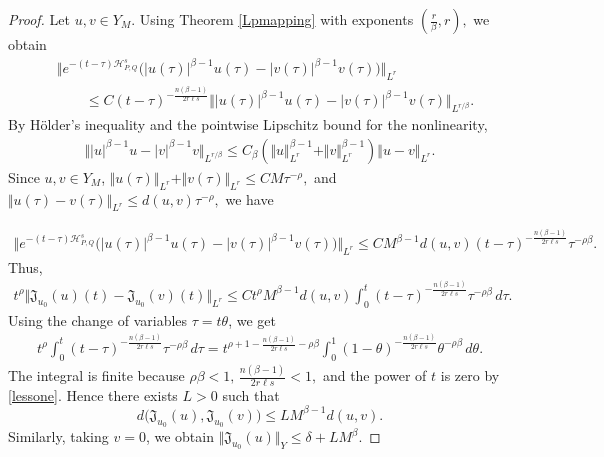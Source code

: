 \documentclass[12pt, reqno]{amsart}
\theoremstyle{definition}
\theoremstyle{remark}
\numberwithin{equation}{section}
\newcommand{\APQ}{\mathcal{H}_{P, Q}}
\begin{document}
\begin{proof}
Let $u,v\in Y_M$. Using Theorem \ref{Lpmapping} with exponents $ \left(\frac r\beta,r\right),$
we obtain
\[
\begin{aligned}
&\Vert
e^{-(t-\tau)\APQ^s}
\big(
|u(\tau)|^{\beta-1}u(\tau)
-
|v(\tau)|^{\beta-1}v(\tau)
\big)
\Vert_{L^r}
\\
&\qquad
\leq
C
(t-\tau)^{-\frac{n(\beta-1)}{2r\ell s}}
\Vert
|u(\tau)|^{\beta-1}u(\tau)
-
|v(\tau)|^{\beta-1}v(\tau)
\Vert_{L^{r/\beta}}.
\end{aligned}
\]
By H\"older's inequality and the pointwise Lipschitz bound for the nonlinearity,
\[
\begin{aligned}
\Vert
|u|^{\beta-1}u
-
|v|^{\beta-1}v
\Vert_{L^{r/\beta}}
\leq
C_\beta
\left(
\Vert u\Vert_{L^r}^{\beta-1}
+
\Vert v\Vert_{L^r}^{\beta-1}
\right)
\Vert u-v\Vert_{L^r}.
\end{aligned}
\]
Since $u,v\in Y_M$, $\Vert u(\tau)\Vert_{L^r} +
    \Vert v(\tau)\Vert_{L^r}
    \leq C M\tau^{-\rho},$
and $\Vert u(\tau)-v(\tau)\Vert_{L^r}
    \leq
    d(u,v)\tau^{-\rho},$ we have

\[
\begin{aligned}
\Vert
e^{-(t-\tau)\APQ^s}
\big(
|u(\tau)|^{\beta-1}u(\tau)
-
|v(\tau)|^{\beta-1}v(\tau)
\big)
\Vert_{L^r}
\leq
C
M^{\beta-1}
d(u,v)
(t-\tau)^{-\frac{n(\beta-1)}{2r\ell s}}
\tau^{-\rho\beta}.
\end{aligned}
\]
Thus,
\[
\begin{aligned}
t^\rho
\Vert
\mathfrak J_{u_0}(u)(t)
-
\mathfrak J_{u_0}(v)(t)
\Vert_{L^r}
\leq
C
t^\rho
M^{\beta-1}
d(u,v)
\int_0^t
(t-\tau)^{-\frac{n(\beta-1)}{2r\ell s}}
\tau^{-\rho\beta}
\,d\tau.
\end{aligned}
\]
Using the change of variables $\tau=t\theta$, we get
\[
\begin{aligned}
t^\rho
\int_0^t
(t-\tau)^{-\frac{n(\beta-1)}{2r\ell s}}
\tau^{-\rho\beta}
\,d\tau
=
t^{
\rho+1
-\frac{n(\beta-1)}{2r\ell s}
-\rho\beta
}
\int_0^1
(1-\theta)^{-\frac{n(\beta-1)}{2r\ell s}}
\theta^{-\rho\beta}
\,d\theta.
\end{aligned}
\]
The integral is finite because $ \rho\beta<1,\,
    \frac{n(\beta-1)}{2r\ell s}<1,$
and the power of $t$ is zero by \eqref{lessone}. Hence there exists $L>0$ such that
\begin{equation}
\label{criticalcontraction}
    d\big(\mathfrak J_{u_0}(u),\mathfrak J_{u_0}(v)\big)
    \leq
    L M^{\beta-1}d(u,v).
\end{equation}
Similarly, taking $v=0$, we obtain
$\Vert \mathfrak J_{u_0}(u)\Vert_Y
    \leq \delta + L M^\beta.$


\end{proof}
\end{document}
